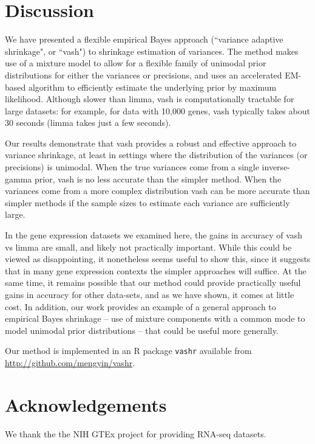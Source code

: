 \documentclass{bioinfo}
\begin{document}
\section{Discussion}

We have presented a flexible empirical Bayes approach (``variance adaptive shrinkage", or ``vash") 
to shrinkage estimation of variances. The method makes use of a mixture model to 
allow for a flexible family of unimodal prior distributions for either the variances or precisions, and uses an accelerated EM-based algorithm to efficiently 
estimate the underlying prior by maximum likelihood. Although slower than limma, vash is computationally tractable for large datasets: for example, for data with 10,000 genes, vash typically takes about 30 seconds (limma takes just a few seconds).

Our results demonstrate that vash provides a robust and effective approach to variance shrinkage, at least in settings where the distribution of the variances
(or precisions) is unimodal. When the true variances come from a single inverse-gamma prior, vash is no less accurate than the simpler method. When the 
variances come from a more complex distribution vash can be more accurate than simpler methods if the sample sizes to estimate each variance are sufficiently large.

In the gene expression datasets we examined here, the gains in accuracy of vash vs limma are small, and likely not practically important. While this could
be viewed as disappointing, it nonetheless seems useful to show this, since it suggests that in many gene expression contexts the simpler approaches will suffice.
At the same time, it remains possible that our method could provide practically useful gains in accuracy for other data-sets, and as we have shown, it comes at little cost.
In addition, our work provides an example of a general approach to empirical Bayes shrinkage -- use of mixture components with a common mode to model
unimodal prior distributions -- that could be useful more generally.

Our method is implemented in an R package \texttt{vashr} available from \href{http://github.com/mengyin/vashr}{http://github.com/mengyin/vashr}.

\section*{Acknowledgements}
We thank the the NIH GTEx project for providing RNA-seq datasets. 
\end{document}
